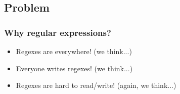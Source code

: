 
\subsection{Problem}
\begin{frame}
\frametitle{Why regular expressions?}

\begin{itemize}
\item Regexes are everywhere! (we think...)
\item<2-> Everyone writes regexes! (we think...)
\item<3-> Regexes are hard to read/write! (again, we think...)
\end{itemize}
%
%
%
%

\end{frame}



